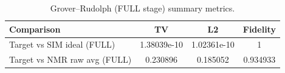 \begin{table}[t]
\centering
\small
\begin{tabular}{lccc}
\hline
Comparison & TV & L2 & Fidelity \\
\hline
Target vs SIM ideal (FULL) & 1.38039e-10 & 1.02361e-10 & 1 \\
Target vs NMR raw avg (FULL) & 0.230896 & 0.185052 & 0.934933 \\
\hline
\end{tabular}
\caption{Grover–Rudolph (FULL stage) summary metrics.}
\label{tab:gr\_full\_summary}
\end{table}
